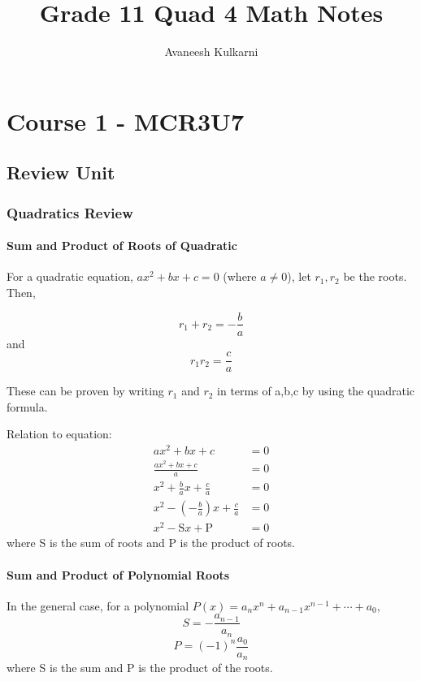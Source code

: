 \documentclass[letterpaper, 12pt]{report}
\title{Grade 11 Quad 4 Math Notes}
\author{Avaneesh Kulkarni}
\date{}
\theoremstyle{definition}
\numberwithin{equation}{section}
\begin{document}
\maketitle
\tableofcontents
\newpage
{}

\chapter{Course 1 - MCR3U7}

\section{Review Unit}

\subsection{Quadratics Review}

\subsubsection*{Sum and Product of Roots of Quadratic}
For a quadratic equation, $ax^2 + bx + c = 0$ (where $a \neq 0$),
let $r_1, r_2$ be the roots. Then,

\begin{equation}\label{sumquad}
	r_1 + r_2 = -\frac{b}{a}
\end{equation}
and
\begin{equation}\label{prodquad}
	r_1 r_2 = \frac{c}{a}
\end{equation}

These can be proven by writing $r_1$ and $r_2$ in terms of a,b,c by using the quadratic formula.

Relation to equation:
\begin{align*}
	ax^2 + bx + c &= 0 \\ 
	\frac{ax^2 + bx + c}{a} &= 0 \\ 
	x^2 + \frac{b}{a}x + \frac{c}{a} &= 0 \\ 
	x^2 - \left( - \frac{b}{a} \right) x + \frac{c}{a} &= 0 \\ 
	x^2 - \mathrm{S} x + \mathrm{P} &= 0 
\end{align*}
where S is the sum of roots and P is the product of roots.

\subsubsection*{Sum and Product of Polynomial Roots}
In the general case, for a polynomial $P(x) = a_nx^n + a_{n-1}x^{n-1} + \dotsb + a_0 $,
\begin{equation}
	S = - \frac{a_{n-1}}{a_n}
\end{equation}
\begin{equation}
	P = (-1)^n \frac{a_0}{a_n}
\end{equation}
where S is the sum and P is the product of the roots.
\end{document}
